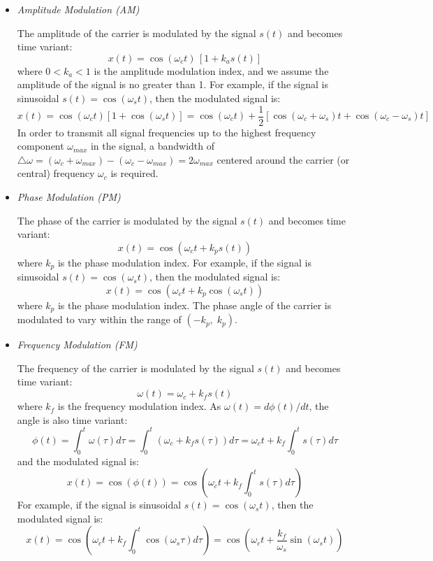 \begin{itemize}
\item {\em Amplitude Modulation (AM)}

  The amplitude of the carrier is modulated by the signal $s(t)$ and becomes 
  time variant:
  \[ 
  x(t)=\cos(\omega_c t)\,[1+k_a s(t)]
  \]  
  where $0<k_a<1$ is the amplitude modulation index, and we assume the 
  amplitude of the signal is no greater than 1. For example, if the signal
  is sinusoidal $s(t)=\cos(\omega_s t)$, then the modulated signal is:
  \[ 
  x(t)=\cos(\omega_ct)[1+\cos(\omega_st)]
  =\cos(\omega_ct)+\frac{1}{2}[\cos(\omega_c+\omega_s)t+\cos(\omega_c-\omega_s)t] 
  \]
  In order to transmit all signal frequencies up to the highest frequency
  component $\omega_{max}$ in the signal, a bandwidth of 
  $\triangle\omega=(\omega_c+\omega_{max})-(\omega_c-\omega_{max})=2\omega_{max}$ 
  centered around the carrier (or central) frequency $\omega_c$ is required.  

\item {\em Phase Modulation (PM)}
  
  The phase of the carrier is modulated by the signal $s(t)$ and becomes
  time variant:
  \[
  x(t)=\cos(\omega_ct+k_p s(t))
  \]
  where $k_p$ is the phase modulation index. For example, if the signal is 
  sinusoidal $s(t)=\cos(\omega_s t)$, then the modulated signal is:
  \[ 
  x(t)=\cos(\omega_ct+k_p \cos(\omega_st))
  \]
  where $k_p$ is the phase modulation index. The phase angle of the carrier 
  is modulated to vary within the range of $(-k_p,\;k_p)$.

\item {\em Frequency Modulation (FM)}  
  
  The frequency of the carrier is modulated by the signal $s(t)$ and becomes
  time variant:
  \[
  \omega(t)=\omega_c+k_f s(t)
  \]
  where $k_f$ is the frequency modulation index. As $\omega(t) =d\phi(t)/dt$,
  the angle is also time variant:
  \[
  \phi(t)=\int_0^t\omega(\tau)d\tau=\int_0^t ( \omega_c+k_f s(\tau)) d\tau
  =\omega_c t+k_f \int_0^t s(\tau)d\tau
  \]
  and the modulated signal is:
  \[ 
  x(t)=\cos(\phi(t))=\cos\left(\omega_c t+k_f \int_0^t s(\tau)d\tau\right)
  \]
  For example, if the signal is sinusoidal $s(t)=\cos(\omega_s t)$, then
  the modulated signal is:
  \[ 
  x(t)=\cos\left(\omega_c t+k_f \int_0^t \cos(\omega_s \tau)d\tau\right)
  =\cos\left(\omega_c t+\frac{k_f}{\omega_s} \sin(\omega_s t)\right)
  \]


\end{itemize}

